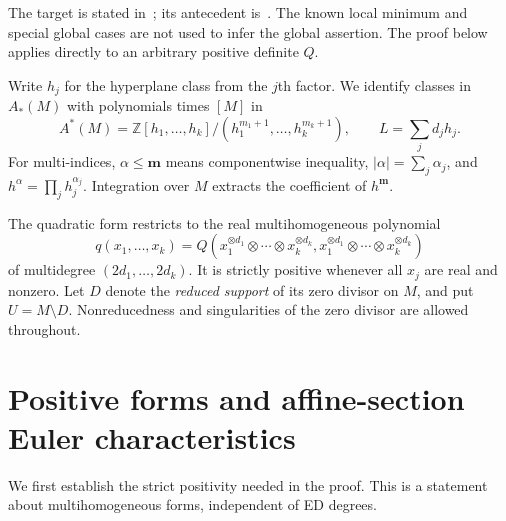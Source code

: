 \documentclass[11pt]{article}
\theoremstyle{remark}\newtheorem{remark}[theorem]{Remark}
\begin{document}
The target is stated in~\cite{repo}; its antecedent is~\cite[Conjecture 3.9]{KMQS}. The known local minimum and special global cases are not used to infer the global assertion. The proof below applies directly to an arbitrary positive definite $Q$.

Write $h_j$ for the hyperplane class from the $j$th factor. We identify classes in $A_*(M)$ with polynomials times $[M]$ in
\[
 A^*(M)=\mathbb Z[h_1,\ldots,h_k]/(h_1^{m_1+1},\ldots,h_k^{m_k+1}),
 \qquad L=\sum_jd_jh_j.
\]
For multi-indices, $\alpha\leq\mathbf m$ means componentwise inequality, $|\alpha|=\sum_j\alpha_j$, and $h^\alpha=\prod_jh_j^{\alpha_j}$. Integration over $M$ extracts the coefficient of $h^{\mathbf m}$.

The quadratic form restricts to the real multihomogeneous polynomial
\begin{equation}\label{eq:q}
 q(x_1,\ldots,x_k)
 =Q(x_1^{\otimes d_1}\otimes\cdots\otimes x_k^{\otimes d_k},
      x_1^{\otimes d_1}\otimes\cdots\otimes x_k^{\otimes d_k})
\end{equation}
of multidegree $(2d_1,\ldots,2d_k)$. It is strictly positive whenever all $x_j$ are real and nonzero. Let $D$ denote the \emph{reduced support} of its zero divisor on $M$, and put $U=M\setminus D$. Nonreducedness and singularities of the zero divisor are allowed throughout.

\section{Positive forms and affine-section Euler characteristics}
We first establish the strict positivity needed in the proof. This is a statement about multihomogeneous forms, independent of ED degrees.
\end{document}

